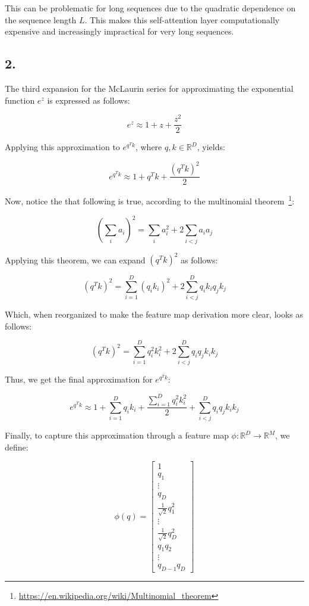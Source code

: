 \documentclass[11pt]{article}
\begin{document}
This can be problematic for long sequences due to the quadratic dependence on the sequence length \(L\). This makes this self-attention layer computationally expensive and increasingly impractical for very long sequences.

\subsection*{2.}

The third expansion for the McLaurin series for approximating the exponential function $e^z$ is expressed as follows:

\begin{equation}
e^z \approx 1 + z + \frac{z^2}{2}
\label{q1:2-mclaurin}
\end{equation}

Applying this approximation to \(e^{q^Tk}\), where \(q, k \in \mathbb{R}^D\), yields:

\[
e^{q^Tk} \approx 1 + q^Tk + \frac{(q^Tk)^2}{2}
\]

Now, notice the that following is true, according to the multinomial theorem~\footnote{\url{https://en.wikipedia.org/wiki/Multinomial_theorem}}:

\[
(\sum_{i}{a_i})^2 = \sum_{i}{a_i^2} + 2 \sum_{i < j}{a_ia_j}
\]

Applying this theorem, we can expand \((q^T k)^2\) as follows:

\[
(q^Tk)^2 = \sum_{i=1}^{D}{(q_i k_i)}^2 + 2 \sum_{i < j}^{D}{q_i k_i q_j k_j}
\]

Which, when reorganized to make the feature map derivation more clear, looks as follows:

\[
(q^Tk)^2 = \sum_{i=1}^{D}{q_i^2 k_i^2} + 2 \sum_{i < j}^{D}{q_i q_j k_i k_j}
\]

Thus, we get the final approximation for \(e^{q^Tk}\):

\[
e^{q^Tk} \approx 1 + \sum_{i=1}^{D}{q_i k_i} + \frac{\sum_{i=1}^{D}{q_i^2 k_i^2}}{2} + \sum_{i < j}^{D}{q_i q_j k_i k_j}
\]

Finally, to capture this approximation through a feature map \(\phi: \mathbb{R}^D \rightarrow \mathbb{R}^M\), we define:

\[
\phi(q) = 
\begin{bmatrix} 
1 \\ 

q_1 \\ 
\vdots \\ 
q_D \\

\frac{1}{\sqrt{2}}q_1^2 \\
\vdots \\
\frac{1}{\sqrt{2}}q_D^2 \\

q_1q_2 \\
\vdots \\
q_{D-1}q_D
\end{bmatrix}
\]
\end{document}
